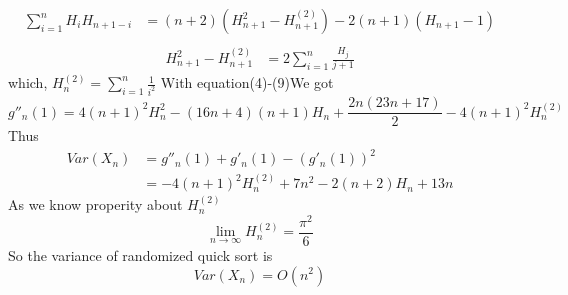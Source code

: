 \documentclass{article}
\begin{document}
	\begin{equation}
	\begin{aligned}
	\sum_{i=1}^{n}H_iH_{n+1-i}&=(n+2)(H^2_{n+1}-H_{n+1}^{(2)})-2(n+1)(H_{n+1}-1)\\
	\end{aligned}
	\end{equation}
	\begin{equation}
	\begin{aligned}
	H_{n+1}^{2}-H_{n+1}^{(2)}&=2\sum_{i=1}^{n}\frac{H_j}{j+1}
	\end{aligned}
	\end{equation}
	which, $H_n^{(2)}=\sum_{i=1}^{n}\frac{1}{i^2}$
	With equation(4)-(9)We got
	$$g''_n(1)=4(n+1)^2H_n^2-(16n+4)(n+1)H_n+\frac{2n(23n+17)}{2}-4(n+1)^2H_n^{(2)}$$
	Thus
	\begin{equation}
	\begin{aligned}
	Var(X_n)&=g''_n(1)+g'_n(1)-(g'_n(1))^2\\
		&=-4(n+1)^2H_n^{(2)}+7n^2-2(n+2)H_n+13n
	\end{aligned}
	\end{equation}
	As we know properity about $H_n^{(2)}$
	$$\lim_{n \to \infty}H_n^{(2)} = \frac{\pi^2}{6}$$
	So the variance of randomized quick sort is 
	$$Var(X_n)=O(n^2)$$
\end{document}
